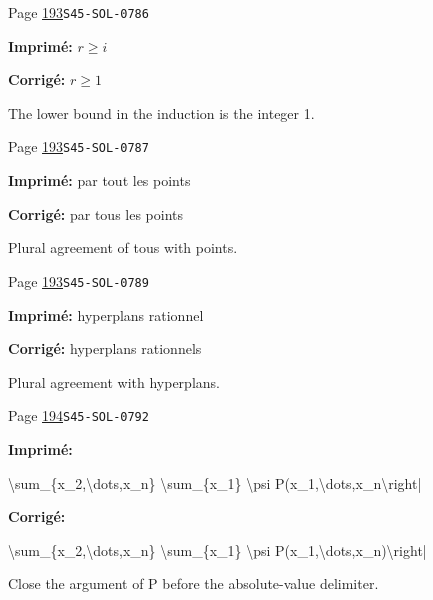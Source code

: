 \begin{description}
\smallskip
\item[\hypertarget{apparatus:FR-0167}{167}] Page \hyperlink{printpage:fr:193}{193}\quad\texttt{S45-SOL-0786}
\par\noindent\textbf{Imprimé:} $r\geqslant i$
\par\noindent\textbf{Corrigé:} $r\geqslant 1$
\par\noindent The lower bound in the induction is the integer 1.
\smallskip
\item[\hypertarget{apparatus:FR-0168}{168}] Page \hyperlink{printpage:fr:193}{193}\quad\texttt{S45-SOL-0787}
\par\noindent\textbf{Imprimé:} par tout les points
\par\noindent\textbf{Corrigé:} par tous les points
\par\noindent Plural agreement of tous with points.
\smallskip
\item[\hypertarget{apparatus:FR-0169}{169}] Page \hyperlink{printpage:fr:193}{193}\quad\texttt{S45-SOL-0789}
\par\noindent\textbf{Imprimé:} hyperplans rationnel
\par\noindent\textbf{Corrigé:} hyperplans rationnels
\par\noindent Plural agreement with hyperplans.
\smallskip
\item[\hypertarget{apparatus:FR-0170}{170}] Page \hyperlink{printpage:fr:194}{194}\quad\texttt{S45-SOL-0792}
\par\noindent\textbf{Imprimé:} {\footnotesize\ttfamily\raggedright \textbackslash{}\allowbreak{}sum\_\allowbreak{}\{\allowbreak{}x\_\allowbreak{}2,\allowbreak{}\textbackslash{}\allowbreak{}dots,\allowbreak{}x\_\allowbreak{}n\}\allowbreak{} \textbackslash{}\allowbreak{}sum\_\allowbreak{}\{\allowbreak{}x\_\allowbreak{}1\}\allowbreak{} \textbackslash{}\allowbreak{}psi P(\allowbreak{}x\_\allowbreak{}1,\allowbreak{}\textbackslash{}\allowbreak{}dots,\allowbreak{}x\_\allowbreak{}n\textbackslash{}\allowbreak{}right|}
\par\noindent\textbf{Corrigé:} {\footnotesize\ttfamily\raggedright \textbackslash{}\allowbreak{}sum\_\allowbreak{}\{\allowbreak{}x\_\allowbreak{}2,\allowbreak{}\textbackslash{}\allowbreak{}dots,\allowbreak{}x\_\allowbreak{}n\}\allowbreak{} \textbackslash{}\allowbreak{}sum\_\allowbreak{}\{\allowbreak{}x\_\allowbreak{}1\}\allowbreak{} \textbackslash{}\allowbreak{}psi P(\allowbreak{}x\_\allowbreak{}1,\allowbreak{}\textbackslash{}\allowbreak{}dots,\allowbreak{}x\_\allowbreak{}n)\allowbreak{}\textbackslash{}\allowbreak{}right|}
\par\noindent Close the argument of P before the absolute-value delimiter.

\end{description}
